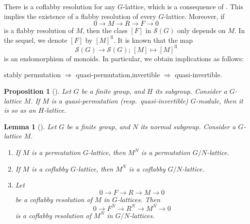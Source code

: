 \documentclass[12pt]{amsart}
\theoremstyle{plain}
\newtheorem{prop}[thm]{Proposition}
\newtheorem{lem}[thm]{Lemma}
\theoremstyle{definition}
\numberwithin{thm}{section}
\numberwithin{equation}{section}
\newcommand{\sS}{\mathscr{S}}
\DeclareMathOperator{\fl}{fl}
\begin{document}
There is a coflabby resolution for any $G$-lattice, which is a consequence of \cite[Lemma 1.1]{Endo1975}. This implies the existence of a flabby resolution of every $G$-lattice. Moreover, if 
\begin{equation*}
0\rightarrow M \rightarrow R \rightarrow F \rightarrow 0
\end{equation*}
is a flabby resolution of $M$, then the class $[F]$ in $\sS(G)$ only depends on $M$. In the sequel, we denote $[F]$ by $[M]^{\fl}$. It is known that the map
\begin{equation*}
    \sS(G)\rightarrow \sS(G);\,[M]\mapsto [M]^{\fl}
\end{equation*}
is an endomorphism of monoids. In particular, we obtain implications as follows: 
\begin{center}
    stably permutation $\Rightarrow$ quasi-permutation,\quad invertible $\Rightarrow$ quasi-invertible. 
\end{center}

\begin{prop}[{\cite[Proposition 2.6]{Hasegawa}}]\label{prop:rtrd}
Let $G$ be a finite group, and $H$ its subgroup. Consider a $G$-lattice $M$. If $M$ is a quasi-permutation (resp.~quasi-invertible) $G$-module, then it is so as an $H$-lattice. 
\end{prop}

\begin{lem}[{\cite[p.~179, Lemme 2 (i), (ii), (iii)]{ColliotThelene1977}}]\label{lem:qtfx}
Let $G$ be a finite group, and $N$ its normal subgroup. Consider a $G$-lattice $M$. 
\begin{enumerate}
\item If $M$ is a permutation $G$-lattice, then $M^{N}$ is a permutation $G/N$-lattice. 
\item If $M$ is a coflabby $G$-lattice, then $M^{N}$ is a coflabby $G/N$-lattice. 
\item Let
\begin{equation*}
0\rightarrow F \rightarrow R \rightarrow M \rightarrow 0
\end{equation*}
be a coflabby resolution of $M$ in $G$-lattices. Then
\begin{equation*}
0\rightarrow F^{N} \rightarrow R^{N} \rightarrow M^{N} \rightarrow 0
\end{equation*}
is a coflabby resolution of $M^{N}$ in $G/N$-lattices. 
\end{enumerate}
\end{lem}
\end{document}
